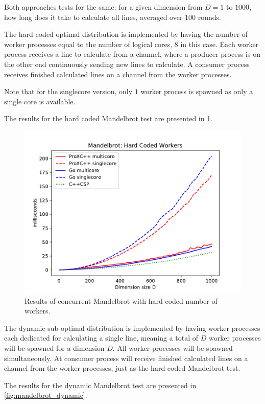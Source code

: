 Both approaches tests for the same; for a given dimension from $D=1$ to $1000$, how long does it take to calculate all lines, averaged over $100$ rounds. 

The hard coded optimal distribution is implemented by having the number of worker processes equal to the number of logical cores, $8$ in this case. Each worker process receives a line to calculate from a channel, where a producer process is on the other end continuously sending new lines to calculate. A consumer process receives finished calculated lines on a channel from the worker processes.

Note that for the singlecore version, only $1$ worker process is spawned as only a single core is available.

The results for the hard coded Mandelbrot test are presented in \cref{fig:mandelbrot_hardcoded}.

\begin{figure}[h!]
    \centering
    \includegraphics[width=0.9\linewidth]{fig/mandelbrot_hardcoded}
    \caption{Results of concurrent Mandelbrot with hard coded number of workers.}
    \label{fig:mandelbrot_hardcoded}
\end{figure}

The dynamic sub-optimal distribution is implemented by having worker processes each dedicated for calculating a single line, meaning a total of $D$ worker processes will be spawned for a dimension $D$. All worker processes will be spawned simultaneously. At consumer process will receive finished calculated lines on a channel from the worker processes, just as the hard coded Mandelbrot test.

The results for the dynamic Mandelbrot test are presented in \cref{fig:mandelbrot_dynamic}.  

